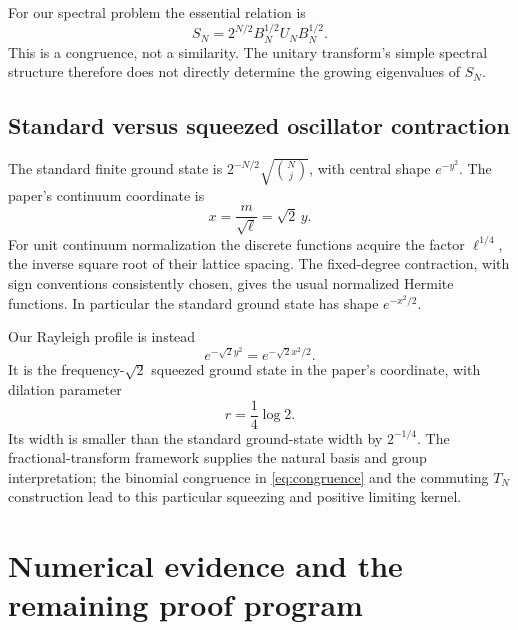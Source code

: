 \documentclass[11pt,reqno]{amsart}
\theoremstyle{definition}\newtheorem{definition}[theorem]{Definition}
\theoremstyle{remark}\newtheorem{remark}[theorem]{Remark}
\begin{document}
For our spectral problem the essential relation is
\begin{equation}\label{eq:congruence}
S_N=2^{N/2}B_N^{1/2}U_NB_N^{1/2}.
\end{equation}
This is a congruence, not a similarity. The unitary transform's simple
spectral structure therefore does not directly determine the growing
eigenvalues of $S_N$.

\subsection{Standard versus squeezed oscillator contraction}
The standard finite ground state is
$2^{-N/2}\sqrt{\binom Nj}$, with central shape $e^{-y^2}$.
The paper's continuum coordinate is
\[
x=\frac m{\sqrt\ell}=\sqrt2\,y.
\]
For unit continuum normalization the discrete functions acquire the
factor $\ell^{1/4}$, the inverse square root of their lattice spacing.
The fixed-degree contraction, with sign conventions consistently
chosen, gives the usual normalized Hermite functions. In particular
the standard ground state has shape $e^{-x^2/2}$.

Our Rayleigh profile is instead
\[
e^{-\sqrt2 y^2}=e^{-\sqrt2 x^2/2}.
\]
It is the frequency-$\sqrt2$ squeezed ground state in the paper's
coordinate, with dilation parameter
\begin{equation}\label{eq:physical-squeeze}
r=\frac14\log2.
\end{equation}
Its width is smaller than the standard ground-state width by
$2^{-1/4}$. The fractional-transform framework supplies the natural
basis and group interpretation; the binomial congruence in
\eqref{eq:congruence} and the commuting $T_N$ construction lead to
this particular squeezing and positive limiting kernel.

\section{Numerical evidence and the remaining proof program}
\end{document}
